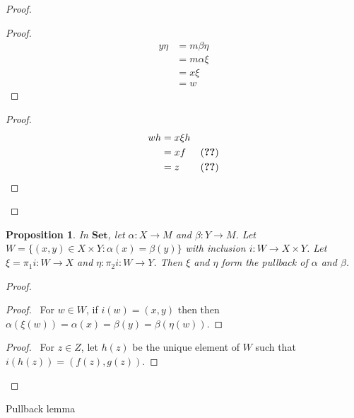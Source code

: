 \documentclass{book}
\let\qed\relax
\newtheorem{prop}[ax]{Proposition}
\theoremstyle{definition}
\newcommand{\Set}{\ensuremath{\mathbf{Set}}}
\begin{document}
\begin{proof}
\pf
{}
\begin{proof}
	\pf
	\begin{align*}
		y \eta & = m \beta \eta \\
		& = m \alpha \xi \\
		& = x \xi \\
		& = w
	\end{align*}
\end{proof}
\begin{proof}
	\pf
	\begin{align*}
		w h & = x \xi h \\
		& = xf & (\text{\stepref{4}}) \\
		& = z & (\text{\stepref{3}})
	\end{align*}
\end{proof}
\qed
\end{proof}

\begin{prop}
In $\Set$, let $\alpha : X \rightarrow M$ and $\beta : Y \rightarrow M$. Let $W = \{ (x,y) \in X \times Y : \alpha(x) = \beta(y) \}$ with inclusion $i : W \rightarrow X \times Y$. Let $\xi = \pi_1 i : W \rightarrow X$ and $\eta : \pi_2 i : W \rightarrow Y$. Then $\xi$ and $\eta$ form the pullback of $\alpha$ and $\beta$.
\end{prop}

\begin{proof}
\pf
{}
\begin{proof}
	\pf\ For $w \in W$, if $i(w) = (x,y)$ then then $\alpha(\xi(w)) = \alpha(x) = \beta(y) = \beta(\eta(w))$.
\end{proof}
\begin{proof}
	\pf\ For $z \in Z$, let $h(z)$ be the unique element of $W$ such that $i(h(z)) = (f(z),g(z))$.
\end{proof}
\qed
\end{proof}

Pullback lemma
\end{document}
